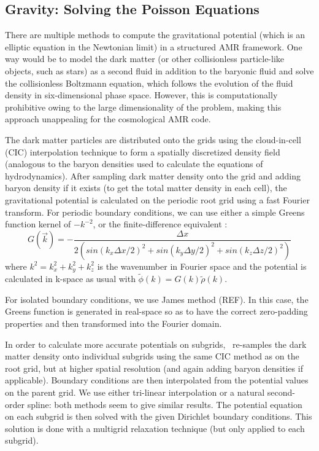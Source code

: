 \subsection{Gravity: Solving the Poisson Equations}
\label{sec.gravity}



There are multiple methods to compute the gravitational potential (which is an elliptic equation in the Newtonian limit) in a structured AMR framework.  One way would be to model the dark matter (or other collisionless particle-like objects, such as stars) as a second fluid in addition to the baryonic fluid and solve the collisionless Boltzmann equation, which follows the evolution of the fluid density in six-dimensional phase space.  However, this is computationally prohibitive owing to the large dimensionality of the problem, making this approach unappealing for the cosmological AMR code.

The dark matter particles are distributed onto the grids using the cloud-in-cell (CIC) interpolation technique to form a spatially discretized density field (analogous to the baryon densities used to calculate the equations of hydrodynamics).  After sampling dark matter density onto the grid and adding baryon density if it exists (to get the total matter density in each cell), the gravitational potential is calculated on the periodic root grid using a fast Fourier transform.  For periodic boundary conditions, we can use either a simple Greens function kernel of $-k^{-2}$, or the finite-difference equivalent \citep{Hockney88}:
\begin{equation}
G(\vec{k}) = - \frac{\Delta x}{2 \left( sin(k_x \Delta x/2)^2 + sin(k_y \Delta y/2)^2 + sin(k_z \Delta z/2)^2 \right) }
\end{equation}
where $k^2 = k_x^2 + k_y^2 + k_z^2$ is the wavenumber in Fourier space and the potential is calculated in k-space as usual with $\tilde{\phi}(k) = G(k) \tilde{\rho}(k)$.  

For isolated boundary conditions, we use James method (REF).  In this case, the Greens function is generated in real-space so as to have the correct zero-padding properties and then transformed into the Fourier domain.

In order to calculate more accurate potentials on subgrids, \enzo\ re-samples the dark matter density onto individual subgrids using the same CIC method as on the root grid, but at higher spatial resolution (and again adding baryon densities if applicable). Boundary conditions are then interpolated from the potential values on the parent grid.  We use either tri-linear interpolation or a natural second-order spline: both methods seem to give similar results. The potential equation on each subgrid is then solved with the given Dirichlet boundary conditions.  This solution is done with a multigrid relaxation technique (but only applied to each subgrid).

